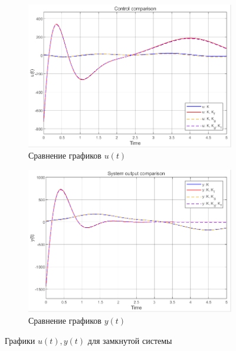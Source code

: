 \documentclass[a4paper, 12pt]{article}
\begin{document}
    \begin{figure}[H]
        \centering
        \begin{subfigure}{0.45\textwidth}
            \centering
            \includegraphics[width=\linewidth]{1task_u.png}
            \caption{Сравнение графиков $u(t)$}
            \label{fig:1task_u}
        \end{subfigure}
        \hspace{5mm}
        \begin{subfigure}{0.45\textwidth}
            \centering
            \includegraphics[width=\linewidth]{1task_yy.png}
            \caption{Сравнение графиков $y(t)$}
            \label{fig:1task_yy}
        \end{subfigure}
        \caption{Графики $u(t),y(t)$ для замкнутой системы}
        \label{fig:1task_u_yy}
    \end{figure}
\end{document}
